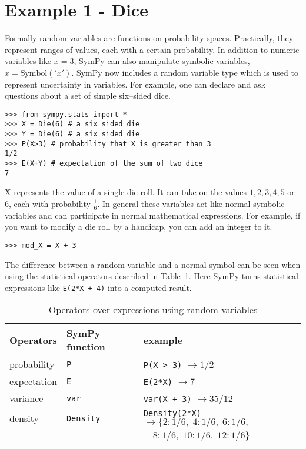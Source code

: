 \section{Example 1 - Dice}

Formally random variables are functions on probability spaces.  Practically,
they represent ranges of values, each with a certain probability.  In addition
to numeric variables like $x = 3$, SymPy can also manipulate symbolic
variables, $x = \text{Symbol}('x')$. SymPy now includes a random variable type
which is used to represent uncertainty in variables.  For example, one can
declare and ask questions about a set of simple six--sided dice.

\begin{lstlisting}
>>> from sympy.stats import *
>>> X = Die(6) # a six sided die
>>> Y = Die(6) # a six sided die
>>> P(X>3) # probability that X is greater than 3
1/2
>>> E(X+Y) # expectation of the sum of two dice
7
\end{lstlisting}

X represents the value of a single die roll. It can take on the values
$1,2,3,4,5$ or $6$, each with probability $\frac{1}{6}$. In general these
variables act like normal symbolic variables and can participate in normal
mathematical expressions. For example, if you want to modify a die roll by a
handicap, you can add an integer to it.

\begin{lstlisting}
>>> mod_X = X + 3
\end{lstlisting}

The difference between a random variable and a normal symbol can be seen when
using the statistical operators described in Table~\ref{tab:stat_ops}.  Here
SymPy turns statistical expressions like {\tt E(2*X + 4)} into a computed
result. 

\begin{table}[h]
\begin{tabular}{|lll|}
\hline
Operators & SymPy function & example\\ \hline
probability & {\tt P} & {\tt P(X > 3)}  $\rightarrow 1/2$\\ \hline
expectation & {\tt E} & {\tt E(2*X)} $\rightarrow 7$ \\ \hline
variance & {\tt var} & {\tt var(X + 3)} $\rightarrow 35/12$\\ \hline
density & {\tt Density} & {\tt Density(2*X)}  $\rightarrow \{2: 1/6,\; 4: 1/6,\; 6: 1/6,$ \\
            & & \phantom{Density(X+3) $\rightarrow$} $\quad 8: 1/6,\; 10: 1/6,\; 12: 1/6\}$ \\ \hline
\end{tabular}
\caption{Operators over expressions using random variables}
\label{tab:stat_ops}
\end{table}


